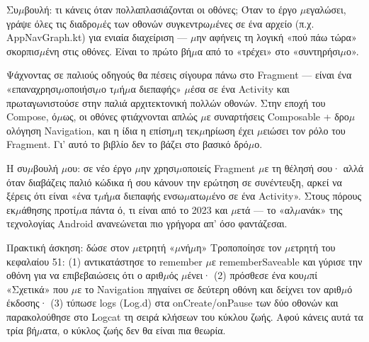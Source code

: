 \begin{tcbinfo}{Συ$\mu$βουλή: τι κάνεις όταν πολλαπλασιάζονται οι οθόνες;}
Όταν το έργο $\mu$εγαλώσει, γράψε όλες τις διαδρο$\mu$ές των οθονών συγκεντρω$\mu$ένες σε ένα αρχείο (π.χ. AppNavGraph.kt) για ενιαία διαχείριση — $\mu$ην αφήνεις τη λογική «πού πάω τώρα» σκορπισ$\mu$ένη στις οθόνες. Είναι το πρώτο βή$\mu$α από το «τρέχει» στο «συντηρήσι$\mu$ο».

\end{tcbinfo}


Ψάχνοντας σε παλιούς οδηγούς θα πέσεις σίγουρα πάνω στο Fragment — είναι ένα «επαναχρησι$\mu$οποιήσι$\mu$ο τ$\mu$ή$\mu$α διεπαφής» $\mu$έσα σε ένα Activity και πρωταγωνιστούσε στην παλιά αρχιτεκτονική πολλών οθονών. Στην εποχή του Compose, ό$\mu$ως, οι οθόνες φτιάχνονται απλώς $\mu$ε συναρτήσεις Composable + δρο$\mu$ολόγηση Navigation, και η ίδια η επίση$\mu$η τεκ$\mu$ηρίωση έχει $\mu$ειώσει τον ρόλο του Fragment. Γι’ αυτό το βιβλίο δεν το βάζει στο βασικό δρό$\mu$ο.

Η συ$\mu$βουλή $\mu$ου: σε νέο έργο $\mu$ην χρησι$\mu$οποιείς Fragment $\mu$ε τη θέλησή σου· αλλά όταν διαβάζεις παλιό κώδικα ή σου κάνουν την ερώτηση σε συνέντευξη, αρκεί να ξέρεις ότι είναι «ένα τ$\mu$ή$\mu$α διεπαφής ενσω$\mu$ατω$\mu$ένο σε ένα Activity». Στους πόρους εκ$\mu$άθησης προτί$\mu$α πάντα ό, τι είναι από το 2023 και $\mu$ετά — το «αλ$\mu$ανάκ» της τεχνολογίας Android ανανεώνεται πιο γρήγορα απ’ όσο φαντάζεσαι.

\begin{tcbpractice}{Πρακτική άσκηση: δώσε στον $\mu$ετρητή «$\mu$νή$\mu$η»}
Τροποποίησε τον $\mu$ετρητή του κεφαλαίου 51: (1) αντικατάστησε το remember $\mu$ε rememberSaveable και γύρισε την οθόνη για να επιβεβαιώσεις ότι ο αριθ$\mu$ός $\mu$ένει· (2) πρόσθεσε ένα κου$\mu$πί «Σχετικά» που $\mu$ε το Navigation πηγαίνει σε δεύτερη οθόνη και δείχνει τον αριθ$\mu$ό έκδοσης· (3) τύπωσε logs (Log.d) στα onCreate/onPause των δύο οθονών και παρακολούθησε στο Logcat τη σειρά κλήσεων του κύκλου ζωής. Αφού κάνεις αυτά τα τρία βή$\mu$ατα, ο κύκλος ζωής δεν θα είναι πια θεωρία.

\end{tcbpractice}

